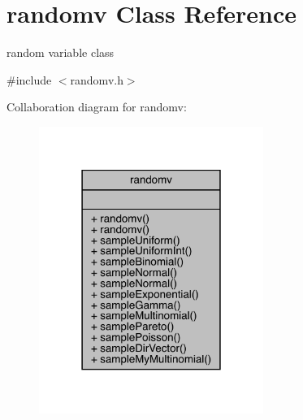 \hypertarget{classrandomv}{}\section{randomv Class Reference}
\label{classrandomv}


random variable class  




{\ttfamily \#include $<$randomv.\+h$>$}



Collaboration diagram for randomv\+:
\nopagebreak
\begin{figure}[H]
\begin{center}
\leavevmode
\includegraphics[width=207pt]{classrandomv__coll__graph}
\end{center}
\end{figure}

